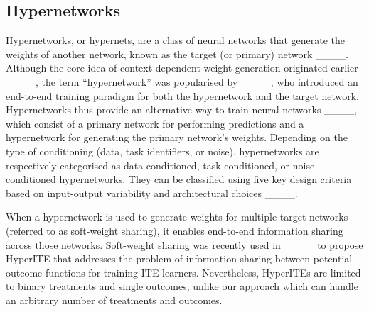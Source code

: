 

\subsection{Hypernetworks}
\label{subsec_hypernetworks}
Hypernetworks, or hypernets, are a class of neural networks that generate the weights of another network, known as the target (or primary) network ____. Although the core idea of context-dependent weight generation originated earlier ____, the term ``hypernetwork'' was popularised by ____, who introduced an end-to-end training paradigm for both the hypernetwork and the target network. Hypernetworks thus provide an alternative way to train neural networks ____, which consist of a primary network for performing predictions and a hypernetwork for generating the primary network’s weights. Depending on the type of conditioning (data, task identifiers, or noise), hypernetworks are respectively categorised as data-conditioned, task-conditioned, or noise-conditioned hypernetworks. They can be classified using five key design criteria based on input-output variability and architectural choices ____.

When a hypernetwork is used to generate weights for multiple target networks (referred to as soft-weight sharing), it enables end-to-end information sharing across those networks. Soft-weight sharing was recently used in ____ to propose HyperITE that addresses the problem of information sharing between potential outcome functions for training ITE learners. Nevertheless, HyperITEs are limited to binary treatments and single outcomes, unlike our approach which can handle an arbitrary number of treatments and outcomes.

